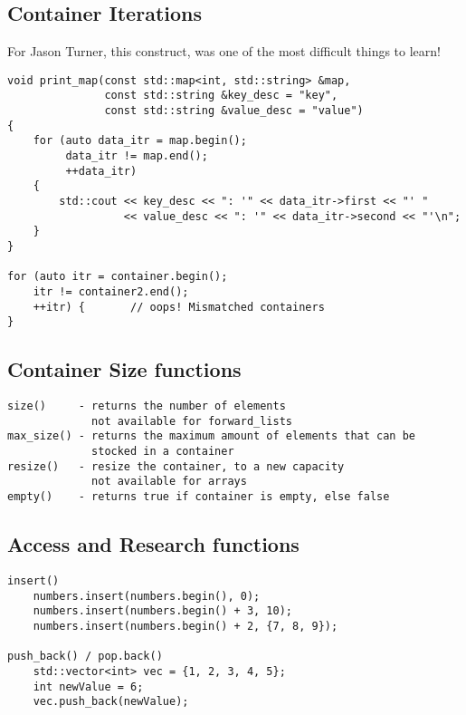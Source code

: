 \subsection{Container Iterations}

For Jason Turner, this construct, was one of the most difficult things to learn!

\begin{verbatim}
void print_map(const std::map<int, std::string> &map,
               const std::string &key_desc = "key",
               const std::string &value_desc = "value")
{
    for (auto data_itr = map.begin();
         data_itr != map.end();
         ++data_itr)
    {
        std::cout << key_desc << ": '" << data_itr->first << "' "
                  << value_desc << ": '" << data_itr->second << "'\n";
    }
}

for (auto itr = container.begin();
    itr != container2.end();
    ++itr) {       // oops! Mismatched containers
}
\end{verbatim}

\subsection{Container Size functions}

\begin{verbatim}
size()     - returns the number of elements
             not available for forward_lists
max_size() - returns the maximum amount of elements that can be
             stocked in a container
resize()   - resize the container, to a new capacity
             not available for arrays
empty()    - returns true if container is empty, else false
\end{verbatim}

\subsection{Access and Research functions}

\begin{verbatim}
insert()
    numbers.insert(numbers.begin(), 0); 
    numbers.insert(numbers.begin() + 3, 10);
    numbers.insert(numbers.begin() + 2, {7, 8, 9});

push_back() / pop.back()
    std::vector<int> vec = {1, 2, 3, 4, 5};
    int newValue = 6;
    vec.push_back(newValue);
\end{verbatim}

